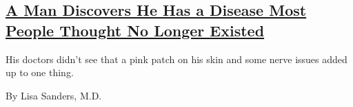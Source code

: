 \begin{enumerate}
  \hypertarget{a-man-discovers-he-has-a-disease-most-people-thought-no-longer-existed}{%
  \subsection{\texorpdfstring{\href{/2019/02/13/magazine/a-man-discovers-he-has-a-disease-most-people-thought-no-longer-existed.html}{A
  Man Discovers He Has a Disease Most People Thought No Longer
  Existed}}{A Man Discovers He Has a Disease Most People Thought No Longer Existed}}\label{a-man-discovers-he-has-a-disease-most-people-thought-no-longer-existed}}

  His doctors didn't see that a pink patch on his skin and some nerve
  issues added up to one thing.

  By Lisa Sanders, M.D.
\end{enumerate}


